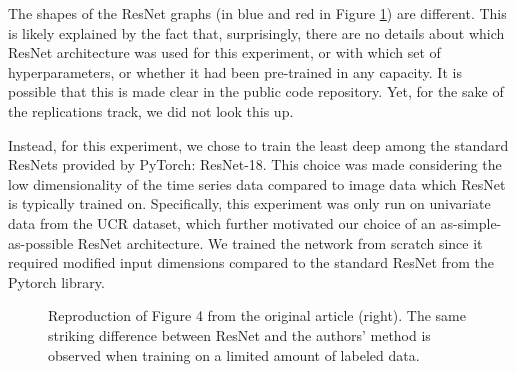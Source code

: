 
The shapes of the ResNet graphs (in blue and red in Figure \ref{fig:sparse}) are different. %
This is likely explained by
the fact that, surprisingly, there are no details about which ResNet architecture was used for this experiment, or with which set of hyperparameters, or whether it had been pre-trained in any capacity. It is possible that this is made clear in the public code repository. Yet, for the sake of the replications track, we did not look this up.

Instead, for this experiment, we chose to train the least deep among the standard ResNets provided by PyTorch: ResNet-18. This choice was made considering the low dimensionality of the time series data compared to image data which ResNet is typically trained on. Specifically, this experiment was only run on univariate data from the UCR dataset, which further motivated our choice of an as-simple-as-possible ResNet architecture. We trained the network from scratch since it required modified input dimensions compared to the standard ResNet from the Pytorch library.

\begin{figure}[h!]%
    \centering
    \qquad
    \caption{Reproduction of Figure 4 from the original article (right). The same striking difference between ResNet and the authors' method is observed when training on a limited amount of labeled data.}%
    \label{fig:sparse}%
\end{figure}

